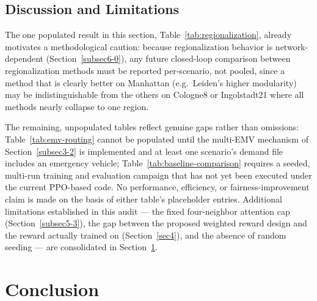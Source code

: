 \documentclass[3p,times]{elsarticle}
\theoremstyle{plain}
\theoremstyle{definition}
\begin{document}
\subsection{Discussion and Limitations}\label{subsec6-3}

The one populated result in this section, Table~\ref{tab:regionalization},
already motivates a methodological caution: because regionalization
behavior is network-dependent (Section~\ref{subsec6-0}), any future
closed-loop comparison between regionalization methods must be
reported per-scenario, not pooled, since a method that is clearly
better on Manhattan (e.g.\ Leiden's higher modularity) may be
indistinguishable from the others on Cologne8 or Ingolstadt21 where all
methods nearly collapse to one region.

The remaining, unpopulated tables reflect genuine gaps rather than
omissions: Table~\ref{tab:emv-routing} cannot be populated until the
multi-EMV mechanism of Section~\ref{subsec3-2} is implemented and at
least one scenario's demand file includes an emergency vehicle;
Table~\ref{tab:baseline-comparison} requires a seeded, multi-run
training and evaluation campaign that has not yet been executed under
the current PPO-based code. No performance, efficiency, or
fairness-improvement claim is made on the basis of either table's
placeholder entries. Additional limitations established in this audit
--- the fixed four-neighbor attention cap (Section~\ref{subsec5-3}),
the gap between the proposed weighted reward design and the reward
actually trained on (Section~\ref{sec4}), and the absence of random
seeding --- are consolidated in Section~\ref{sec7}.



\section{Conclusion}\label{sec7}
\end{document}
